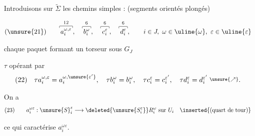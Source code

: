 



Introduisons sur $\widetilde\Sigma$ les  chemins simples : (segments orientés plongés)

\[
(\unsure{21})\qquad\overset{12}{\overset{\rule[-.2ex]{.4pt}{.6ex}\rule[.4ex]{2em}{.4pt}\rule[-.2ex]{.4pt}{.6ex}}{a_i^{\omega,\varepsilon}}},\quad\overset{6}{\overset{\rule[-.2ex]{.4pt}{.6ex}\rule[.4ex]{1.3em}{.4pt}\rule[-.2ex]{.4pt}{.6ex}}{b_i^\omega}},\quad\overset{6}{\overset{\rule[-.2ex]{.4pt}{.6ex}\rule[.4ex]{1.3em}{.4pt}\rule[-.2ex]{.4pt}{.6ex}}{c_i^\varepsilon}},\quad\overset{6}{\overset{\rule[-.2ex]{.4pt}{.6ex}\rule[.4ex]{1.3em}{.4pt}\rule[-.2ex]{.4pt}{.6ex}}{d_i^\varepsilon}},\qquad
i\in J,\ \omega\in\uline{\omega},\ \varepsilon\in\uline{\varepsilon}
\]

chaque paquet  formant un torseur sous $G_J$


$\tau$ opérant par
\[
(22)\quad \tau a_i^{\omega,\varepsilon}=a_i^{\omega,\unsure{\varepsilon'}},\quad
\tau b_i^\omega=b_i^\omega,\quad \tau c_i^\varepsilon=c_i^{\varepsilon'},\quad
\tau d_i^\varepsilon=d_i^{\varepsilon'}\;\raisebox{.4ex}{$\scriptstyle\unsure{\nearrow}$}.
\]

On a
\[
(23)\qquad a_i^{\omega\varepsilon}:{\unsure{S}}_i^\varepsilon\longrightarrow\deleted{\unsure{S_i^\varepsilon}}R_i^\omega\text{ sur }U_i\quad\inserted{(\text{quart de tour})}
\]

ce qui caractérise $a_i^{\omega\varepsilon}$. 


